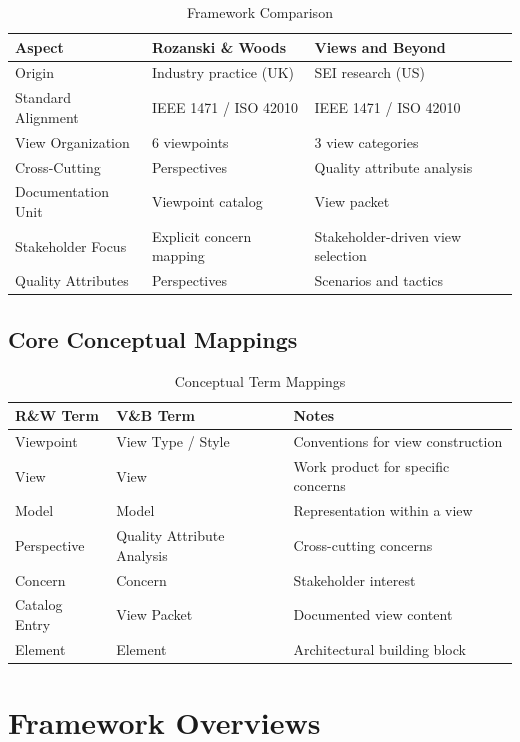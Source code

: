 \documentclass[11pt]{article}
\begin{document}
\begin{longtable}{@{}L{3cm} L{4.5cm} L{5cm}@{}}
\caption{Framework Comparison} \\
\toprule
\textbf{Aspect} & \textbf{Rozanski \& Woods} & \textbf{Views and Beyond} \\
\midrule
\endfirsthead
\bottomrule
\endlastfoot
Origin & Industry practice (UK) & SEI research (US) \\
Standard Alignment & IEEE 1471 / ISO 42010 & IEEE 1471 / ISO 42010 \\
View Organization & 6 viewpoints & 3 view categories \\
Cross-Cutting & Perspectives & Quality attribute analysis \\
Documentation Unit & Viewpoint catalog & View packet \\
Stakeholder Focus & Explicit concern mapping & Stakeholder-driven view selection \\
Quality Attributes & Perspectives & Scenarios and tactics \\
\end{longtable}

\subsection{Core Conceptual Mappings}

\begin{longtable}{@{}L{4cm} L{4cm} L{4.5cm}@{}}
\caption{Conceptual Term Mappings} \\
\toprule
\textbf{R\&W Term} & \textbf{V\&B Term} & \textbf{Notes} \\
\midrule
\endfirsthead
\bottomrule
\endlastfoot
Viewpoint & View Type / Style & Conventions for view construction \\
View & View & Work product for specific concerns \\
Model & Model & Representation within a view \\
Perspective & Quality Attribute Analysis & Cross-cutting concerns \\
Concern & Concern & Stakeholder interest \\
Catalog Entry & View Packet & Documented view content \\
Element & Element & Architectural building block \\
\end{longtable}

\section{Framework Overviews}
\end{document}
